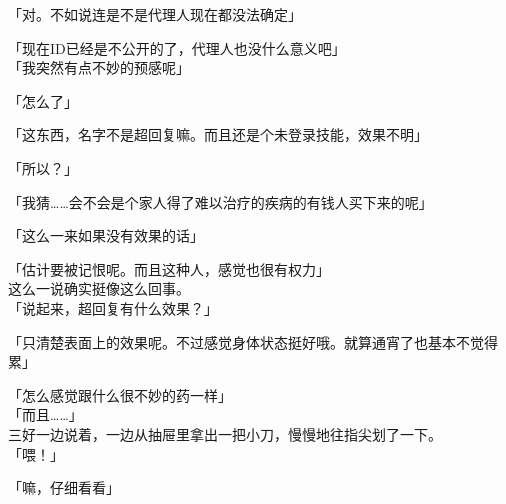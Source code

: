 「对。不如说连是不是代理人现在都没法确定」

「现在ID已经是不公开的了，代理人也没什么意义吧」\\

「我突然有点不妙的预感呢」

「怎么了」

「这东西，名字不是超回复嘛。而且还是个未登录技能，效果不明」

「所以？」

「我猜……会不会是个家人得了难以治疗的疾病的有钱人买下来的呢」

「这么一来如果没有效果的话」

「估计要被记恨呢。而且这种人，感觉也很有权力」\\

这么一说确实挺像这么回事。\\

「说起来，超回复有什么效果？」

「只清楚表面上的效果呢。不过感觉身体状态挺好哦。就算通宵了也基本不觉得累」

「怎么感觉跟什么很不妙的药一样」\\

「而且……」\\

三好一边说着，一边从抽屉里拿出一把小刀，慢慢地往指尖划了一下。\\

「喂！」

「嘛，仔细看看」\\

